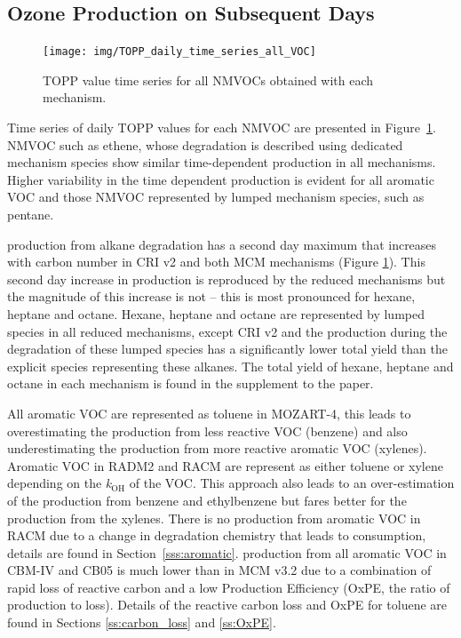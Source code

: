 \subsection{Ozone Production on Subsequent Days} \label{ss:profiles} %

\begin{figure}
    \centering
    \texttt{[image: img/TOPP\_daily\_time\_series\_all\_VOC]}
    \vspace{0mm}
    \caption{TOPP value time series for all NMVOCs obtained with each mechanism.}
    \vspace{-4mm}
    \label{f:TOPP_dailies}
\end{figure}

Time series of daily TOPP values for each NMVOC are presented in \mbox{Figure \ref{f:TOPP_dailies}}. 
NMVOC such as ethene, whose degradation is described using dedicated mechanism species show similar time-dependent  production in all mechanisms.
Higher variability in the time dependent  production is evident for all aromatic VOC and those NMVOC represented by lumped mechanism species, such as pentane.

 production from alkane degradation has a second day maximum that increases with carbon number in CRI v2 and both MCM mechanisms (Figure \ref{f:TOPP_dailies}).
This second day increase in  production is reproduced by the reduced mechanisms but the magnitude of this increase is not -- this is most pronounced for hexane, heptane and octane.
Hexane, heptane and octane are represented by lumped species in all reduced mechanisms, except CRI v2 and the  production during the degradation of these lumped species has a significantly lower total  yield than the explicit species representing these alkanes.
The total  yield of hexane, heptane and octane in each mechanism is found in the supplement to the paper.

All aromatic VOC are represented as toluene in MOZART-4, this leads to overestimating the  production from less reactive VOC (benzene) and also underestimating the  production from more reactive aromatic VOC (xylenes).
Aromatic VOC in RADM2 and RACM are represent as either toluene or xylene depending on the \textit{k}$_{\text{OH}}$ of the VOC.
This approach also leads to an over-estimation of the  production from benzene and ethylbenzene but fares better for the  production from the xylenes.
There is no  production from aromatic VOC in RACM due to a change in degradation chemistry that leads to  consumption, details are found in \mbox{Section \ref{sss:aromatic}}.
 production from all aromatic VOC in CBM-IV and CB05 is much lower than in MCM v3.2 due to a combination of rapid loss of reactive carbon and a low  Production Efficiency (OxPE, the ratio of  production to  loss).
Details of the reactive carbon loss and OxPE for toluene are found in Sections \ref{ss:carbon_loss} and \ref{ss:OxPE}.

